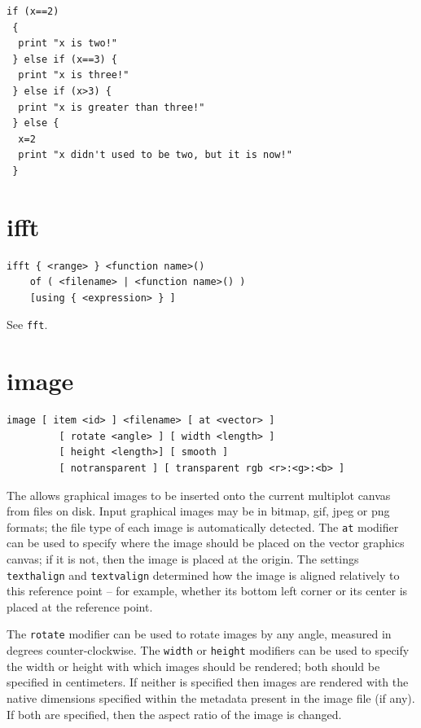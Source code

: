 \begin{verbatim}
if (x==2)
 {
  print "x is two!"
 } else if (x==3) {
  print "x is three!"
 } else if (x>3) {
  print "x is greater than three!"
 } else {
  x=2
  print "x didn't used to be two, but it is now!"
 }
\end{verbatim}


\section{ifft}

\begin{verbatim}
ifft { <range> } <function name>()
    of ( <filename> | <function name>() )
    [using { <expression> } ]
\end{verbatim}

See {\tt fft}.


\section{image}

\begin{verbatim}
image [ item <id> ] <filename> [ at <vector> ]
         [ rotate <angle> ] [ width <length> ]
         [ height <length>] [ smooth ]
         [ notransparent ] [ transparent rgb <r>:<g>:<b> ]
\end{verbatim}

The  allows graphical images to be inserted onto the current
multiplot canvas from files on disk. Input graphical images may be in bitmap,
gif, jpeg or png formats; the file type of each image is automatically
detected.  The {\tt at} modifier can be used to specify where the image should
be placed on the vector graphics canvas; if it is not, then the image is placed
at the origin. The settings {\tt texthalign} and {\tt textvalign} determined
how the image is aligned relatively to this reference point -- for example,
whether its bottom left corner or its center is placed at the reference point.

The {\tt rotate} modifier can be used to rotate images by any angle, measured
in degrees counter-clockwise.  The {\tt width} or {\tt height} modifiers can be
used to specify the width or height with which images should be rendered; both
should be specified in centimeters. If neither is specified then images are
rendered with the native dimensions specified within the metadata present in
the image file (if any). If both are specified, then the aspect ratio of the
image is changed.

